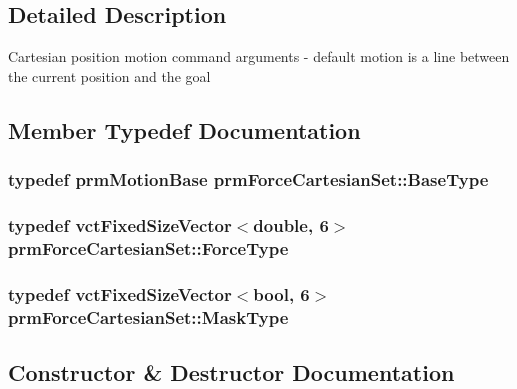 \subsection{Detailed Description}
Cartesian position motion command arguments -\/ default motion is a line between the current position and the goal 

\subsection{Member Typedef Documentation}
\hypertarget{classprm_force_cartesian_set_a1b8582b968aaf818d1305d80d2f7f5df}{}
\subsubsection[{Base\+Type}]{\setlength{\rightskip}{0pt plus 5cm}typedef {\bf prm\+Motion\+Base} {\bf prm\+Force\+Cartesian\+Set\+::\+Base\+Type}}\label{classprm_force_cartesian_set_a1b8582b968aaf818d1305d80d2f7f5df}
\hypertarget{classprm_force_cartesian_set_aef7a9a5a3ce601f7d1f1c752ddb36c00}{}
\subsubsection[{Force\+Type}]{\setlength{\rightskip}{0pt plus 5cm}typedef {\bf vct\+Fixed\+Size\+Vector}$<$double, 6$>$ {\bf prm\+Force\+Cartesian\+Set\+::\+Force\+Type}}\label{classprm_force_cartesian_set_aef7a9a5a3ce601f7d1f1c752ddb36c00}
\hypertarget{classprm_force_cartesian_set_abcc1516523be27cf3b572d0d1c463db9}{}
\subsubsection[{Mask\+Type}]{\setlength{\rightskip}{0pt plus 5cm}typedef {\bf vct\+Fixed\+Size\+Vector}$<$bool, 6$>$ {\bf prm\+Force\+Cartesian\+Set\+::\+Mask\+Type}}\label{classprm_force_cartesian_set_abcc1516523be27cf3b572d0d1c463db9}


\subsection{Constructor \& Destructor Documentation}
\hypertarget{classprm_force_cartesian_set_a0365087de929b46d3f79bbd55491731c}{}
